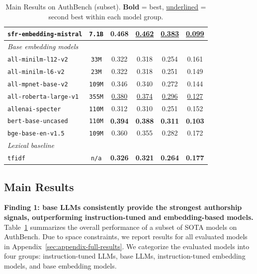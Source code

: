 \documentclass[11pt]{article}
\begin{document}
\begin{table}[h!]
{\begin{tabular}{lccccc}
\texttt{sfr-embedding-mistral} & \texttt{7.1B} & 0.468 & \underline{0.462} & \underline{0.383} & \underline{0.099} \\
\midrule
\multicolumn{6}{l}{\textit{Base embedding models}} \\
\midrule
\texttt{all-minilm-l12-v2} & \texttt{33M} & 0.322 & 0.318 & 0.254 & 0.161 \\
\texttt{all-minilm-l6-v2} & \texttt{23M} & 0.322 & 0.318 & 0.251 & 0.149 \\
\texttt{all-mpnet-base-v2} & \texttt{109M} & 0.346 & 0.340 & 0.272 & 0.144 \\
\texttt{all-roberta-large-v1} & \texttt{355M} & \underline{0.380} & \underline{0.374} & \underline{0.296} & \underline{0.127} \\
\texttt{allenai-specter} & \texttt{110M} & 0.312 & 0.310 & 0.251 & 0.152 \\
\texttt{bert-base-uncased} & \texttt{110M} & \textbf{0.394} & \textbf{0.388} & \textbf{0.311} & \textbf{0.103} \\
\texttt{bge-base-en-v1.5} & \texttt{109M} & 0.360 & 0.355 & 0.282 & 0.172 \\
\midrule
\multicolumn{6}{l}{\textit{Lexical baseline}} \\
\midrule
\texttt{tfidf} & \texttt{n/a} & \textbf{0.326} & \textbf{0.321} & \textbf{0.264} & \textbf{0.177} \\
\bottomrule
\end{tabular}
}
\caption{Main Results on AuthBench (subset). \textbf{Bold} = best, \underline{underlined} = second best within each model group. }

\label{tab:overall-leaderboard}
\end{table}

\subsection{Main Results}
\label{sec:mainresults}
\textbf{Finding 1: base LLMs consistently provide the strongest authorship signals, outperforming instruction-tuned and embedding-based models.} 
Table~\ref{tab:overall-leaderboard} summarizes the overall performance of a subset of SOTA models on AuthBench. Due to space constraints, we report results for all evaluated models in Appendix~\ref{sec:appendix-full-results}. We categorize the evaluated models into four groups: instruction-tuned LLMs, base LLMs, instruction-tuned embedding models, and base embedding models.
\end{document}
